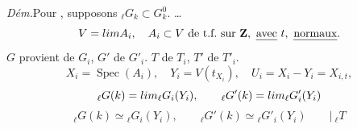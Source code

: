\documentclass[11pt,a4paper]{article}
\begin{document}
\emph{Dém.}\quad Pour , supposons ${}_\ell G_k \subset
G^0_k$. \ldots
\[
V = \varinjlim A_i , \quad A_i \subset V \text{ de t.f.\ sur } \mathbf{Z},
\ \text{\uncertain{avec} } t, \ \text{\uncertain{normaux}}.
\]
$G$ provient de $G_i$, $G'$ de $G'_i$. $T$ de $T_i$, $T'$ de $T'_i$.
\[
X_i = \operatorname{Spec}(A_i), \quad Y_i = V(t_{X_i}), \quad U_i = X_i - Y_i
= X_{i,t} ,
\]
\[
{}_\ell G(k) = \varinjlim {}_\ell G_i(Y_i), \qquad {}_\ell G'(k) = \varinjlim
{}_\ell G'_i(Y_i)
\]
\[
{}_\ell G(k) \simeq {}_\ell G_i(Y_i), \qquad {}_\ell G'(k) \simeq {}_\ell
G'_i(Y_i) \qquad \Big|\ {}_\ell T
\]
\end{document}

